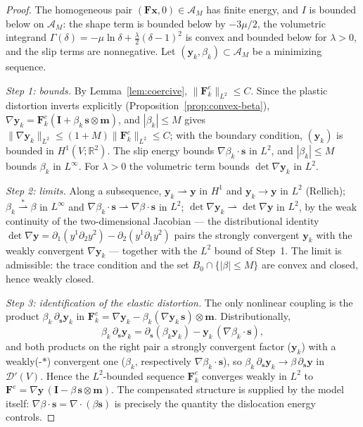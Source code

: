 \documentclass[12pt]{article}
\theoremstyle{plain}
\theoremstyle{definition}
\newcommand{\bF}{\bm{F}}
\newcommand{\bs}{\bm{s}}
\newcommand{\bmm}{\bm{m}}
\newcommand{\by}{\bm{y}}
\newcommand{\bx}{\bm{x}}
\newcommand{\bI}{\bm{I}}
\newcommand{\Fe}{\bF^{e}}
\newcommand{\R}{\mathbb{R}}
\begin{document}
\begin{proof}
The homogeneous pair $(\bF\bx,0)\in\mathcal{A}_{M}$ has finite energy, and $I$
is bounded below on $\mathcal{A}_{M}$: the shape term is bounded below by
$-3\mu/2$, the volumetric integrand
$\Gamma(\delta)=-\mu\ln\delta+\tfrac{\lambda}{2}(\delta-1)^{2}$ is convex and
bounded below for $\lambda>0$, and the slip terms are nonnegative. Let
$(\by_{k},\beta_{k})\subset\mathcal{A}_{M}$ be a minimizing sequence.

\emph{Step 1: bounds.} By Lemma~\ref{lem:coercive},
$\|\Fe_{k}\|_{L^{2}}\le C$. Since the plastic distortion inverts explicitly
(Proposition~\ref{prop:convex-beta}), $\nabla\by_{k}=\Fe_{k}(\bI+\beta_{k}\,
\bs\otimes\bmm)$, and $|\beta_{k}|\le M$ gives
$\|\nabla\by_{k}\|_{L^{2}}\le(1+M)\|\Fe_{k}\|_{L^{2}}\le C$; with the boundary
condition, $(\by_{k})$ is bounded in $H^{1}(V;\R^{2})$. The slip energy bounds
$\nabla\beta_{k}\cdot\bs$ in $L^{2}$, and $|\beta_{k}|\le M$ bounds
$\beta_{k}$ in $L^{\infty}$. For $\lambda>0$ the volumetric term bounds
$\det\nabla\by_{k}$ in $L^{2}$.

\emph{Step 2: limits.} Along a subsequence, $\by_{k}\rightharpoonup\by$ in
$H^{1}$ and $\by_{k}\to\by$ in $L^{2}$ (Rellich);
$\beta_{k}\overset{\ast}{\rightharpoonup}\beta$ in $L^{\infty}$ and
$\nabla\beta_{k}\cdot\bs\rightharpoonup\nabla\beta\cdot\bs$ in $L^{2}$;
$\det\nabla\by_{k}\rightharpoonup\det\nabla\by$ in $L^{2}$, by the weak
continuity of the two-dimensional Jacobian --- the distributional identity
$\det\nabla\by=\partial_{1}(y^{1}\partial_{2}y^{2})
-\partial_{2}(y^{1}\partial_{1}y^{2})$ pairs the strongly convergent $\by_{k}$
with the weakly convergent $\nabla\by_{k}$ --- together with the $L^{2}$ bound
of Step~1. The limit is admissible: the trace condition and the set
$B_{0}\cap\{|\beta|\le M\}$ are convex and closed, hence weakly closed.

\emph{Step 3: identification of the elastic distortion.} The only nonlinear
coupling is the product $\beta_{k}\,\partial_{\bs}\by_{k}$ in
$\Fe_{k}=\nabla\by_{k}-\beta_{k}(\nabla\by_{k}\,\bs)\otimes\bmm$.
Distributionally,
\begin{equation*}
  \beta_{k}\,\partial_{\bs}\by_{k}
  =\partial_{\bs}(\beta_{k}\by_{k})-\by_{k}\,(\nabla\beta_{k}\cdot\bs),
\end{equation*}
and both products on the right pair a strongly convergent factor ($\by_{k}$)
with a weakly(-$\ast$) convergent one ($\beta_{k}$, respectively
$\nabla\beta_{k}\cdot\bs$), so
$\beta_{k}\,\partial_{\bs}\by_{k}\to\beta\,\partial_{\bs}\by$ in
$\mathcal{D}'(V)$. Hence the $L^{2}$-bounded sequence $\Fe_{k}$ converges
weakly in $L^{2}$ to $\Fe=\nabla\by\,(\bI-\beta\,\bs\otimes\bmm)$. The
compensated structure is supplied by the model itself:
$\nabla\beta\cdot\bs=\nabla\cdot(\beta\bs)$ is precisely the quantity the
dislocation energy controls.


\end{proof}
\end{document}
